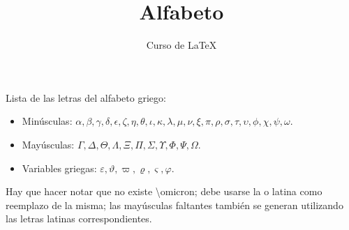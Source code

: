 \documentclass[12pt,letterpaper]{article}
\title{Alfabeto}
\author{Curso de \LaTeX}
\begin{document}
\maketitle

Lista de las letras del alfabeto griego:

\begin{itemize}
\item Minúsculas: $\alpha, \beta, \gamma, \delta, 
\epsilon, \zeta, \eta, \theta, 
\iota, \kappa, \lambda, \mu,
\nu, \xi, \pi, \rho,
\sigma, \tau, \upsilon, \phi, 
\chi, \psi, \omega.$

\item Mayúsculas: $\Gamma, \Delta, \Theta, \Lambda, \Xi, \Pi, \Sigma, \Upsilon, \Phi, \Psi, \Omega.$

\item Variables griegas: $\varepsilon, \vartheta, \varpi, \varrho, \varsigma, \varphi.$
\end{itemize}

Hay que hacer notar que no existe \textbackslash omicron; debe usarse la o latina como reemplazo de la misma; las mayúsculas faltantes también se generan utilizando las letras latinas correspondientes. 
\end{document}

